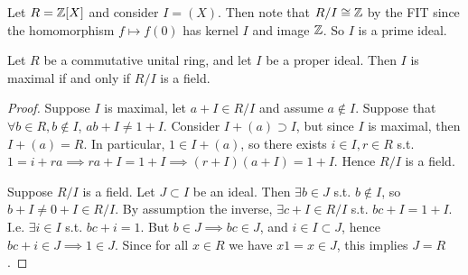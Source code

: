 \begin{example}
  Let $R=\mathbb Z[X]$ and consider $I=(X)$. Then note that $R/I\cong\mathbb Z$ by the FIT since the
  homomorphism $f\mapsto f(0)$ has kernel $I$ and image $\mathbb Z$. So $I$ is a prime ideal.
\end{example}

\begin{theorem}
  Let $R$ be a commutative unital ring, and let $I$ be a proper ideal. Then $I$ is maximal
  if and only if $R/I$ is a field.
  \label{<+label+>}
\end{theorem}
\begin{proof}
  Suppose $I$ is maximal, let $a+I\in R/I$ and assume $a\not\in I$. Suppose that $\forall
  b\in R, b\not\in I$, $ab+I\neq 1+I$. Consider $I+(a) \supset I$, but since $I$ is
  maximal, then $I+(a)= R$. In particular, $1\in I+(a)$, so there exists $i\in I, r\in R$
  s.t. $1=i+ra\implies ra+I=1+I \implies (r+I)(a+I)=1+I$. Hence $R/I$ is a field.

  Suppose $R/I$ is a field. Let $J\subset I$ be an ideal. Then $\exists b\in J$ s.t.
  $b\not\in I$, so $b+I\neq 0+I\in R/I$. By assumption the inverse, $\exists c+I\in R/I$
  s.t. $bc+I = 1+I$. I.e. $\exists i\in I$ s.t. $bc+i=1$. But $b\in J\implies bc\in J$, and 
  $i\in I\subset J$, hence $bc+i\in J\implies 1\in J$. Since for all $x\in R$ we have
  $x1=x\in J$, this implies $J=R$.
\end{proof}
